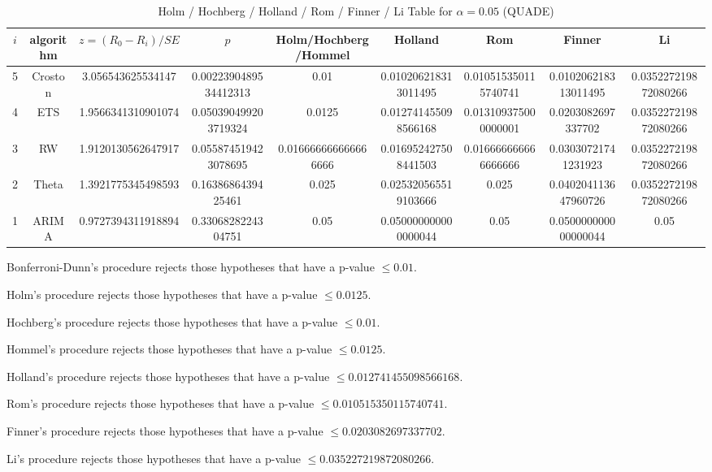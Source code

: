 \documentclass[a4paper,10pt]{article}
\begin{document}
\begin{landscape}
\begin{table}[!htp]
\centering\scriptsize
\caption{Holm / Hochberg / Holland / Rom / Finner / Li Table for $\alpha=0.05$ (QUADE)}
\begin{tabular}{ccccccccc}
$i$&algorithm&$z=(R_0 - R_i)/SE$&$p$&Holm/Hochberg/Hommel&Holland&Rom&Finner&Li\\
\hline
5&Croston&3.056543625534147&0.0022390489534412313&0.01&0.010206218313011495&0.010515350115740741&0.010206218313011495&0.035227219872080266\\
4&ETS&1.9566341310901074&0.050390499203719324&0.0125&0.012741455098566168&0.013109375000000001&0.0203082697337702&0.035227219872080266\\
3&RW&1.9120130562647917&0.055874519423078695&0.016666666666666666&0.016952427508441503&0.016666666666666666&0.03030721741231923&0.035227219872080266\\
2&Theta&1.3921775345498593&0.1638686439425461&0.025&0.025320565519103666&0.025&0.040204113647960726&0.035227219872080266\\
1&ARIMA&0.9727394311918894&0.3306828224304751&0.05&0.050000000000000044&0.05&0.050000000000000044&0.05\\
\hline
\end{tabular}
\end{table}
Bonferroni-Dunn's procedure rejects those hypotheses that have a p-value $\le0.01$.


Holm's procedure rejects those hypotheses that have a p-value $\le0.0125$.


Hochberg's procedure rejects those hypotheses that have a p-value $\le0.01$.


Hommel's procedure rejects those hypotheses that have a p-value $\le0.0125$.


Holland's procedure rejects those hypotheses that have a p-value $\le0.012741455098566168$.


Rom's procedure rejects those hypotheses that have a p-value $\le0.010515350115740741$.


Finner's procedure rejects those hypotheses that have a p-value $\le0.0203082697337702$.


Li's procedure rejects those hypotheses that have a p-value $\le0.035227219872080266$.



\newpage


\end{landscape}
\end{document}
